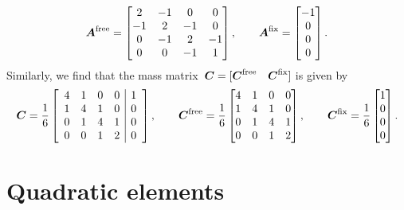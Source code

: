 \begin{example}
\[\boldsymbol{A}^{\mathrm{free}}=\begin{bmatrix}
2&-1&0&0\\ -1&2&-1&0\\ 0&-1&2&-1\\ 0&0&-1&1\end{bmatrix},\qquad
\boldsymbol{A}^{\mathrm{fix}}=\begin{bmatrix}-1\\ 0\\ 0\\ 0\end{bmatrix}.
\]
Similarly, we find that the mass 
matrix~$\boldsymbol{C}=[\boldsymbol{C}^{\mathrm{free}}\quad\boldsymbol{C}^{\mathrm{fix}}]$ is given by
\[
\boldsymbol{C}=\frac{1}{6}\left[\begin{array}{cccc|c}
4&1&0&0&1\\ 1&4&1&0&0\\ 0&1&4&1&0\\ 0&0&1&2&0\end{array}\right],\qquad
\boldsymbol{C}^{\mathrm{free}}=\frac{1}{6}\begin{bmatrix}
4&1&0&0\\ 1&4&1&0\\ 0&1&4&1\\ 0&0&1&2\end{bmatrix},\qquad
\boldsymbol{C}^{\mathrm{fix}}=\frac{1}{6}\begin{bmatrix}1\\ 0\\ 0\\ 0\end{bmatrix}.
\]
\end{example}

\section{Quadratic elements}\label{sec: quadratic elements}

